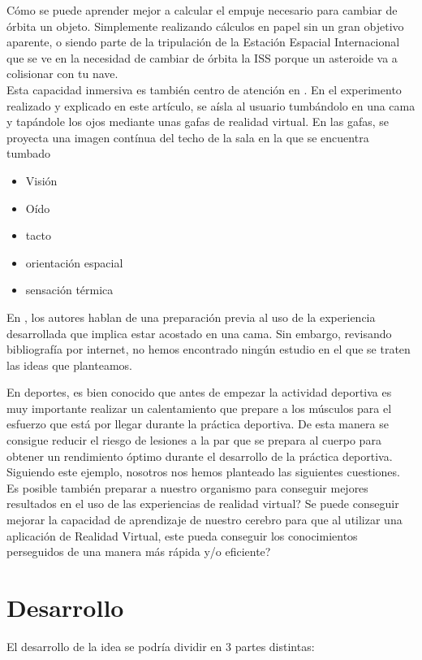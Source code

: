 \documentclass[twoside,twocolumn]{article}
\begin{document}
Cómo se puede aprender mejor a calcular el empuje necesario para cambiar de órbita un objeto. Simplemente realizando cálculos en papel sin un gran objetivo aparente, o siendo parte de la tripulación de la Estación Espacial Internacional que se ve en la necesidad de cambiar de órbita la ISS porque un asteroide va a colisionar con tu nave.\\

Esta capacidad inmersiva es también centro de atención en \cite{Presence}. En el experimento realizado y explicado en este artículo, se aísla al usuario tumbándolo en una cama y tapándole los ojos mediante unas gafas de realidad virtual. En las gafas, se proyecta una imagen contínua del techo de la sala en la que se encuentra tumbado

\begin{itemize}
\item Visi\'on
\item O\'ido
\item tacto
\item orientaci\'on espacial
\item sensaci\'on t\'ermica
\end{itemize}

En \cite{Presence}, los autores hablan de una preparaci\'on previa al uso de la experiencia desarrollada que implica estar acostado en una cama. Sin embargo, revisando bibliografía por internet, no hemos encontrado ningún estudio en el que se traten las ideas que planteamos.

En deportes, es bien conocido que antes de empezar la actividad deportiva es muy importante realizar un calentamiento que prepare a los músculos para el esfuerzo que está por llegar durante la práctica deportiva. De esta manera se consigue reducir el riesgo de lesiones a la par que se prepara al cuerpo para obtener un rendimiento óptimo durante el desarrollo de la práctica deportiva.\\

Siguiendo este ejemplo, nosotros nos hemos planteado las siguientes cuestiones. Es posible también preparar a nuestro organismo para conseguir mejores resultados en el uso de las experiencias de realidad virtual? Se puede conseguir mejorar la capacidad de aprendizaje de nuestro cerebro para que al utilizar una aplicación de Realidad Virtual, este pueda conseguir los conocimientos perseguidos de una manera más rápida y/o eficiente?

\section{Desarrollo}
El desarrollo de la idea se podría dividir en 3 partes distintas:
\end{document}
